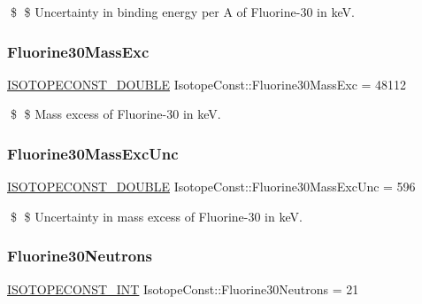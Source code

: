 \$ \$ Uncertainty in binding energy per A of Fluorine-\/30 in keV. \mbox{\label{group___isotope_const-_fluorine-_f30_ga4876addf8ff730681ed0e3555e026bb5}} 
\subsubsection{\texorpdfstring{Fluorine30\+Mass\+Exc}{Fluorine30MassExc}}
{\footnotesize\ttfamily \mbox{\hyperlink{group___isotope_const-_macros_ga8f45a7272ce02c0b4c65c44636ed719a}{I\+S\+O\+T\+O\+P\+E\+C\+O\+N\+S\+T\+\_\+\+D\+O\+U\+B\+LE}} Isotope\+Const\+::\+Fluorine30\+Mass\+Exc = 48112}

\$ \$ Mass excess of Fluorine-\/30 in keV. \mbox{\label{group___isotope_const-_fluorine-_f30_gac7f4912170d25a135cac0473db606a7a}} 
\subsubsection{\texorpdfstring{Fluorine30\+Mass\+Exc\+Unc}{Fluorine30MassExcUnc}}
{\footnotesize\ttfamily \mbox{\hyperlink{group___isotope_const-_macros_ga8f45a7272ce02c0b4c65c44636ed719a}{I\+S\+O\+T\+O\+P\+E\+C\+O\+N\+S\+T\+\_\+\+D\+O\+U\+B\+LE}} Isotope\+Const\+::\+Fluorine30\+Mass\+Exc\+Unc = 596}

\$ \$ Uncertainty in mass excess of Fluorine-\/30 in keV. \mbox{\label{group___isotope_const-_fluorine-_f30_gaa44a45ceae40ac0081701b81c0a8cbdd}} 
\subsubsection{\texorpdfstring{Fluorine30\+Neutrons}{Fluorine30Neutrons}}
{\footnotesize\ttfamily \mbox{\hyperlink{group___isotope_const-_macros_ga5f18360b3e99483a35c32d789e62621c}{I\+S\+O\+T\+O\+P\+E\+C\+O\+N\+S\+T\+\_\+\+I\+NT}} Isotope\+Const\+::\+Fluorine30\+Neutrons = 21}

